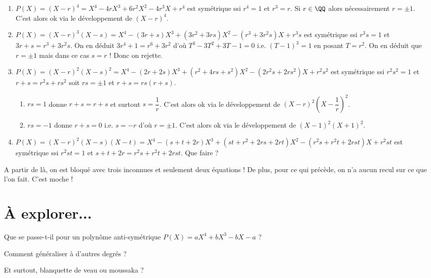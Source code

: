 \documentclass[12pt]{amsart}
\begin{document}
\begin{enumerate}
	\item $P(X) = (X - r)^4
	            = X^4
	            - 4 r X^3
	            + 6 r^2 X^2
	            - 4 r^3 X
	            + r^4$
	       est symétrique
	       ssi
	       $r^4 = 1$ et $r^3 = r$.
	       Si $r\in \QQ$ alors nécessairement $r = \pm 1$.
	       C'est alors ok via le développement de $(X - r)^4$.

	\item $P(X) = (X - r)^3 (X - s)
	            = X^4
	            - (3 r + s) X^3
	            + (3 r^2 + 3 r s) X^2
	            - (r^3 + 3 r^2 s) X
	            + r^3 s$
	       est symétrique
	       ssi
	       $r^3 s = 1$ et $3 r + s = r^3 + 3 r^2 s$.
	       On en déduit $3 r^4 + 1 = r^6 + 3 r^2$
	       d'où $T^3 - 3 T^2 + 3 T - 1 = 0$
	       i.e. $(T - 1)^3 = 1$
	       en posant $T = r^2$.
	       On en déduit que $r = \pm 1$ mais dans ce cas $s = r$ !
	       Donc on rejette. 

	\item $P(X) = (X - r)^2 (X - s)^2
	            = X^4
	            - (2 r  + 2 s) X^3
	            + (r^2 + 4 r s + s^2) X^2
	            - (2 r^2 s + 2 r s^2) X
	            + r^2 s^2
	            $
	       est symétrique
	       ssi
	       $r^2 s^2 = 1$ et $r + s = r^2 s + r s^2$ soit
	       $r s = \pm 1$ et $r + s = rs(r + s)$.
	       
	\begin{enumerate}
		\item $r s = 1$ donne $r  + s = r + s$ et surtout $s = \dfrac1r$.
		C'est alors ok via le développement de $(X - r)^2 \left( X - \dfrac1r \right)^2$.

		\item $r s = -1$ donne $r  + s = 0$ i.e. $s = - r$ d'où $r = \pm 1$.
		C'est alors ok via le développement de $(X - 1)^2 ( X + 1)^2$.
	\end{enumerate}
	
	\item $P(X) = (X - r)^2 (X - s) (X - t)
	            = X^4
	            - (s + t + 2 r) X^3
	            + (s t + r^2 + 2 r s + 2 r t) X^2
	            - (r^2 s + r^2 t + 2 r s t) X 
	            + r^2 s t$
	       est symétrique
	       ssi
	       $r^2 s t = 1$ et $s + t + 2 r = r^2 s + r^2 t + 2 r s t$. Que faire ?
\end{enumerate}

A partir de là, on est bloqué avec trois inconnues et seulement deux équations ! De plus, pour ce qui précède, on n'a aucun recul sur ce que l'on fait. C'est moche !



\section{À explorer...}

Que se passe-t-il pour un polynôme anti-symétrique $P(X) = a X^4 + b X^3 - b X - a$ ?

\medskip

Comment généraliser à d'autres degrés ?

\medskip

Et surtout, blanquette de veau ou moussaka ?
\end{document}

